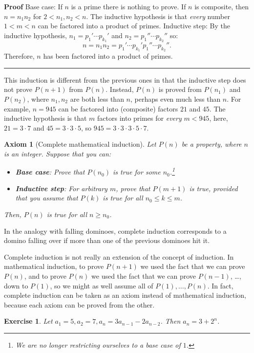 \documentclass[11pt,a4paper]{report}
\newcommand*{\qed}{\hfill\rule{1ex}{1.5ex}}
\newtheorem{axiom}{Axiom}
\newtheorem{exercise}{Exercise}
\begin{document}
\textbf{Proof} Base case: If $n$ is a prime there is nothing to prove. If $n$ is composite, then $n=n_1 n_2$ for $2 < n_1, n_2 < n$. The inductive hypothesis is that \emph{every} number $1<m<n$ can be factored into a product of primes. Inductive step: By the inductive hypothesis, $n_1=p_1' \cdots p_{k_1}'$ and $n_2=p_1'' \cdots p_{k_2}''$ so:
\[
n = n_1 n_2 = p_1' \cdots p_{k_1}' p_1'' \cdots p_{k_2}''.
\]
Therefore, $n$ has been factored into a product of primes.\qed

This induction is different from the previous ones in that the inductive step does not prove $P(n+1)$ from $P(n)$. Instead, $P(n)$ is proved from $P(n_1)$ and $P(n_2)$, where $n_1,n_2$ are both less than $n$, perhaps even much less than $n$. For example, $n=945$ can be factored into (composite) factors $21$ and $45$. The inductive hypothesis is that $m$ factors into primes for \emph{every} $m<945$, here, $21=3\cdot 7$ and $45=3\cdot 3\cdot 5$, so $945=3\cdot 3\cdot 3\cdot 5\cdot 7$.

\begin{axiom}[Complete mathematical induction] Let $P(n)$ be a property, where $n$ is an integer. Suppose that you can:
\begin{itemize}
\item \textbf{Base case}: Prove that $P(n_0)$ is true for some $n_0$.\footnote{We are no longer restricting ourselves to a base case of $1$.} 
\item \textbf{Inductive step}: For arbitrary $m$, prove that $P(m+1)$ is true, provided that you \emph{assume} that $P(k)$ is true for all $n_0\leq k\leq m$.
\end{itemize}
Then, $P(n)$ is true for \emph{all} $n\geq n_0$.
\end{axiom}

In the analogy with falling dominoes, complete induction corresponds to a domino falling over if more than one of the previous dominoes hit it.

Complete induction is not really an extension of the concept of induction. In mathematical induction, to prove $P(n+1)$ we used the fact that we can prove $P(n)$, and to prove $P(n)$ we used the fact that we can prove $P(n-1)$, \ldots, down to $P(1)$, so we might as well assume all of $P(1),\ldots,P(n)$. In fact, complete induction can be taken as an axiom instead of mathematical induction, because each axiom can be proved from the other.

\begin{exercise}
Let $a_1=5, a_2=7, a_n=3a_{n-1} - 2a_{n-2}$. Then $a_n=3+2^n$.
\end{exercise}
\end{document}
